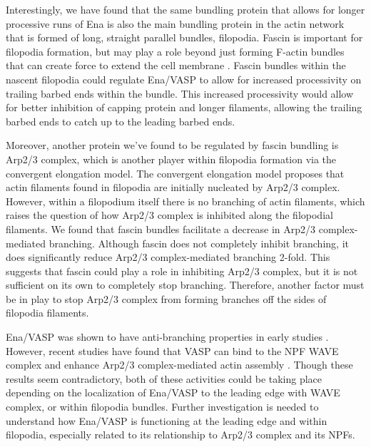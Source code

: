 Interestingly, we have found that the same bundling protein that allows for longer processive runs of Ena is also the main bundling protein in the actin network that is formed of long, straight parallel bundles, filopodia. Fascin is important for filopodia formation, but may play a role beyond just forming F-actin bundles that can create force to extend the cell membrane \citep{vignjevic_role_2006,cant_drosophila_1994}. Fascin bundles within the nascent filopodia could regulate Ena/VASP to allow for increased processivity on trailing barbed ends within the bundle. This increased processivity would allow for better inhibition of capping protein and longer filaments, allowing the trailing barbed ends to catch up to the leading barbed ends. 

Moreover, another protein we've found to be regulated by fascin bundling is Arp2/3 complex, which is another player within filopodia formation via the convergent elongation model. The convergent elongation model proposes that actin filaments found in filopodia are initially nucleated by Arp2/3 complex. However, within a filopodium itself there is no branching of actin filaments, which raises the question of how Arp2/3 complex is inhibited along the filopodial filaments. We found that fascin bundles facilitate a decrease in Arp2/3 complex-mediated branching. Although fascin does not completely inhibit branching, it does significantly reduce Arp2/3 complex-mediated branching 2-fold. This suggests that fascin could play a role in inhibiting Arp2/3 complex, but it is not sufficient on its own to completely stop branching. Therefore, another factor must be in play to stop Arp2/3 complex from forming branches off the sides of filopodia filaments. 

Ena/VASP was shown to have anti-branching properties in early studies \citep{bear_antagonism_2002,plastino_actin_2004,samarin_how_2003, skoble_pivotal_2001}. However, recent studies have found that VASP can bind to the NPF WAVE complex and enhance Arp2/3 complex-mediated actin assembly \citep{chen_ena/vasp_2014,havrylenko_wave_2015}. Though these results seem contradictory, both of these activities could be taking place depending on the localization of Ena/VASP to the leading edge with WAVE complex, or within filopodia bundles. Further investigation is needed to understand how Ena/VASP is functioning at the leading edge and within filopodia, especially related to its relationship to Arp2/3 complex and its NPFs.

